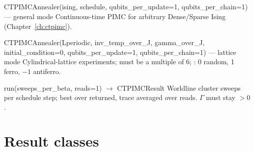 \subsection{}

\begin{apibox}{CTPIMCAnnealer(ising, schedule, qubits\_per\_update=1,
qubits\_per\_chain=1)\quad — general mode}
Continuous-time PIMC for arbitrary Dense/Sparse Ising
(Chapter~\ref{ch:ctpimc}).
\end{apibox}

\begin{apibox}{CTPIMCAnnealer(Lperiodic, inv\_temp\_over\_J, gamma\_over\_J,
initial\_condition=0, qubits\_per\_update=1, qubits\_per\_chain=1)\quad
— lattice mode}
Cylindrical-lattice experiments;  must be a multiple of 6;
: 0 random, 1 ferro, $-1$ antiferro.
\end{apibox}

\begin{apibox}{run(sweeps\_per\_beta, reads=1) $\rightarrow$ CTPIMCResult}
Worldline cluster sweeps per schedule step; best over  returned,
trace averaged over reads. $\Gamma$ must stay $>0$.
\end{apibox}

\section{Result classes}
\label{sec:api-results}

